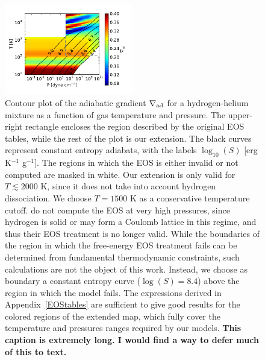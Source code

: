 \documentclass[apj]{emulateapj}
\newcommand{\delad}{\nabla_{\rm ad}}
\newcommand{\App}[1]{Appendix~\ref{#1}}
\begin{document}
\begin{figure}[h]
\centering
\includegraphics[width=0.5\textwidth]{../../figs/ModelAtmospheres/RadSelfGravRealEOS/PaperFigs/delad_S_mixt.pdf}
\caption{Contour plot of the adiabatic gradient $\delad$ for a hydrogen-helium mixture as a function of gas temperature and pressure. The upper-right rectangle encloses the region described by the original \citet{saumon95} EOS tables, while the rest of the plot is our extension. The black curves represent constant entropy adiabats, with the labels $\log_{10}(S)$ [erg K$^{-1}$ g$^{-1}$]. The regions in which the EOS is either invalid or not computed are masked in white. Our extension is only valid for $T \lesssim 2000$ K, since it does not take into account hydrogen dissociation. We choose $T=1500$ K as a conservative temperature cutoff. \citet{saumon95} do not compute the EOS at very high pressures, since hydrogen is solid or may form a Coulomb lattice in this regime, and thus their EOS treatment is no longer valid. While the boundaries of the region in which the free-energy EOS treatment fails can be determined from fundamental thermodynamic constraints, such calculations are not the object of this work. Instead, we choose as boundary a constant entropy curve ($\log(S)=8.4$) above the region in which the \citet{saumon95} model fails. The expressions derived in \App{EOStables} are sufficient to give good results for the colored regions of the extended map, which fully cover the temperature and pressures ranges required by our models. {\bf This caption is extremely long.  I would find a way to defer much of this to text.}}
\label{fig:deladmap}
\end{figure}

\end{document}
